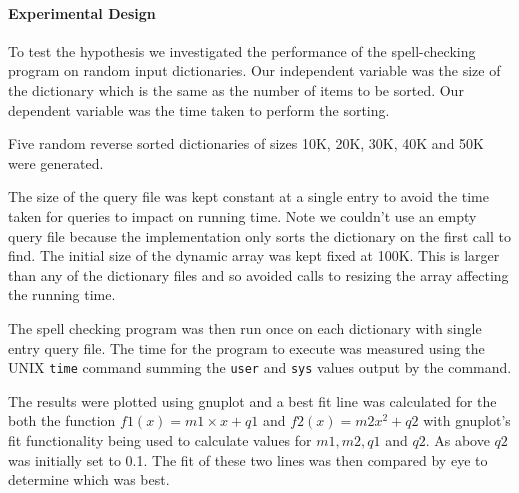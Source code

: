 \documentclass[a4]{article}
\begin{document}
\paragraph{Experimental Design}
To test the hypothesis we investigated the performance of the spell-checking program on random input dictionaries.  Our independent variable was the size of the dictionary which is the same as the number of items to be sorted.  Our dependent variable was the time taken to perform the sorting.

Five random reverse sorted dictionaries of sizes 10K, 20K, 30K, 40K and 50K were generated.

The size of the query file was kept constant at a single entry to avoid the time taken for queries to impact on running time.  Note we couldn't use an empty query file because the implementation only sorts the dictionary on the first call to find.  The initial size of the dynamic array was kept fixed at 100K.  This is larger than any of the dictionary files and so avoided calls to resizing the array affecting the running time.

The spell checking program was then run once on each dictionary with single entry query file.  The time for the program to execute was measured using the UNIX \texttt{time} command summing the \texttt{user} and \texttt{sys} values output by the command.  

The results were plotted using gnuplot and a best fit line was calculated for the both the function $f1(x) = m1 \times x + q1$ and $f2(x) = m2x^2 + q2$ with gnuplot's fit functionality being used to calculate values for $m1, m2, q1$ and $q2$.  As above $q2$ was initially set to 0.1.  The fit of these two lines was then compared by eye to determine which was best. 
\end{document}
